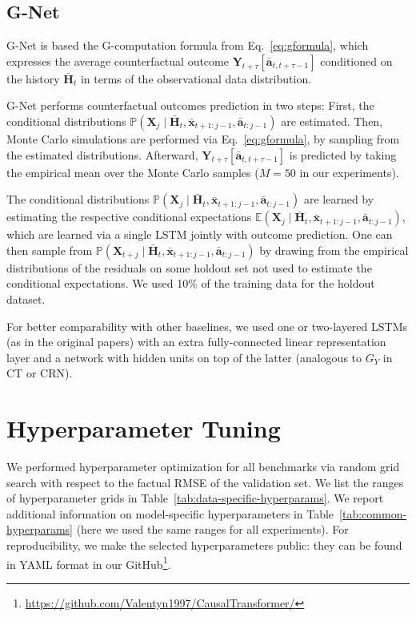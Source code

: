 \documentclass{article}
\theoremstyle{plain}
\theoremstyle{definition}
\theoremstyle{remark}
\newcommand{\shortname}{CT\xspace}
\begin{document}
\subsection{G-Net}

G-Net is based the G-computation formula from Eq.~\eqref{eq:gformula}, which expresses the average counterfactual outcome $\mathbf{Y}_{t + \tau}[\bar{\mathbf{a}}_{t, t+\tau-1}]$ conditioned on the history $\bar{\mathbf{H}}_t$ in terms of the observational data distribution.

G-Net performs counterfactual outcomes prediction in two steps: First, the conditional distributions $\mathbb{P}(\mathbf{X}_{j} \mid \bar{\mathbf{H}}_t, \bar{\mathbf{x}}_{t+1:j-1}, \bar{\mathbf{a}}_{t:j-1})$ are estimated. Then, Monte Carlo simulations are performed via Eq.~\eqref{eq:gformula}, by sampling from the estimated distributions. Afterward, $\mathbf{Y}_{t + \tau}[\bar{\mathbf{a}}_{t, t+\tau-1}]$ is predicted by taking the empirical mean over the Monte Carlo samples ($M = 50$ in our experiments). 

The conditional distributions $\mathbb{P}(\mathbf{X}_{j} \mid \bar{\mathbf{H}}_t, \bar{\mathbf{x}}_{t+1:j-1}, \bar{\mathbf{a}}_{t:j-1})$ are learned by estimating the respective conditional expectations $\mathbb{E}(\mathbf{X}_{j} \mid \bar{\mathbf{H}}_t, \bar{\mathbf{x}}_{t+1:j-1}, \bar{\mathbf{a}}_{t:j-1})$, which are learned via a single LSTM jointly with outcome prediction. One can then sample from $\mathbb{P}(\mathbf{X}_{t+j} \mid \bar{\mathbf{H}}_t, \bar{\mathbf{x}}_{t+1:j-1}, \bar{\mathbf{a}}_{t:j-1})$ by drawing from the empirical distributions of the residuals on some holdout set not used to estimate the conditional expectations. We used 10\% of the training data for the holdout dataset.

For better comparability with other baselines, we used one or two-layered LSTMs (as in the original papers) with an extra fully-connected linear representation layer and a network with hidden units on top of the latter (analogous to $G_Y$ in \shortname or CRN).

\clearpage
\section{Hyperparameter Tuning} \label{app:hparams}

We performed hyperparameter optimization for all benchmarks via random grid search with respect to the factual RMSE of the validation set. We list the ranges of hyperparameter grids in Table~\ref{tab:data-specific-hyperparams}. We report additional information on model-specific hyperparameters in Table~\ref{tab:common-hyperparams} (here we used the same ranges for all experiments). For reproducibility, we make the selected hyperparameters public: they can be found in YAML format in our GitHub\footnote{ \url{https://github.com/Valentyn1997/CausalTransformer/}}. 
\end{document}
